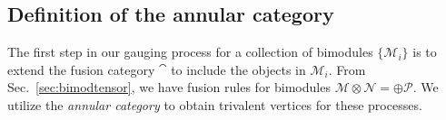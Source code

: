 
\subsection{Definition of the annular category}

%
The first step in our gauging process for a collection of bimodules $\{\mathcal{M}_i\}$ is to extend the fusion category $\cat$ to include the objects in $\mathcal{M}_i$. From Sec.~\ref{sec:bimodtensor}, we have fusion rules for bimodules $\mathcal{M}\otimes\mathcal{N}=\oplus\mathcal{P}$. We utilize the \emph{annular category} to obtain trivalent vertices for these processes. 

